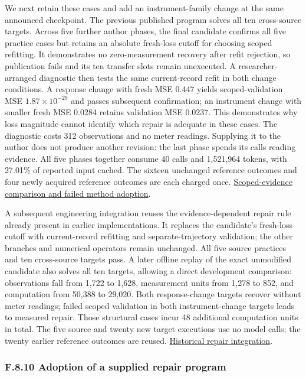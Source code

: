 \documentclass[11pt,a4paper]{article}
\begin{document}
We next retain these cases and add an instrument-family change at the same
announced checkpoint. The previous published program solves all ten cross-source
targets. Across five further author phases, the final candidate confirms all five
practice cases but retains an absolute fresh-loss cutoff for choosing scoped
refitting. It demonstrates no zero-measurement recovery after refit rejection,
so publication fails and its ten transfer slots remain unexecuted. A
researcher-arranged diagnostic then tests the same current-record refit in both
change conditions. A response change with fresh MSE 0.447 yields scoped-validation
MSE \(1.87\times10^{-29}\) and passes subsequent confirmation; an instrument change
with smaller fresh MSE 0.0284 retains validation MSE 0.0237. This demonstrates why
loss magnitude cannot identify which repair is adequate in these cases. The
diagnostic costs 312 observations and no meter readings. Supplying it to the
author does not produce another revision: the last phase spends its calls reading
evidence. All five phases together consume 40 calls and 1,521,964 tokens, with
27.01\% of reported input cached. The sixteen unchanged reference outcomes and
four newly acquired reference outcomes are each charged once.
\hyperlink{artifact-90}{Scoped-evidence comparison and failed method adoption}.


A subsequent engineering integration reuses the evidence-dependent repair rule
already present in earlier implementations. It replaces the candidate's
fresh-loss cutoff with current-record refitting and separate-trajectory validation;
the other branches and numerical operators remain unchanged. All five source
practices and ten cross-source targets pass. A later offline replay of the exact
unmodified candidate also solves all ten targets, allowing a direct development
comparison: observations fall from 1,722 to 1,628, measurement units from 1,278 to
852, and computation from 50,388 to 29,020. Both response-change targets recover
without meter readings; failed scoped validation in both instrument-change targets
leads to measured repair. Those structural cases incur 48 additional computation
units in total. The five source and twenty new target executions use no model
calls; the twenty earlier reference outcomes are reused.
\hyperlink{artifact-91}{Historical repair integration}.


\subsubsection*{F.8.10 Adoption of a supplied repair program}
\end{document}
